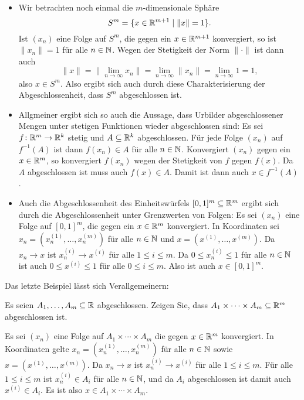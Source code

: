 \documentclass[a4paper,10pt]{article}
\begin{document}
\begin{bsp}
 \begin{itemize}
  \item
   Wir betrachten noch einmal die $m$-dimensionale Sphäre
   \[
    S^m = \{x \in \mathbb{R}^{m+1} \mid \|x\| = 1\}.
   \]
   Ist $(x_n)$ eine Folge auf $S^m$, die gegen ein $x \in \mathbb{R}^{m+1}$ konvergiert, so ist $\|x_n\| = 1$ für alle $n \in \mathbb{N}$. Wegen der Stetigkeit der Norm $\|\cdot\|$ ist dann auch
   \[
    \|x\|
    = \|\lim_{n \to \infty} x_n\|
    = \lim_{n \to \infty} \|x_n\|
    = \lim_{n \to \infty} 1
    = 1,
   \]
   also $x \in S^m$. Also ergibt sich auch durch diese Charakterisierung der Abgeschlossenheit, dass $S^m$ abgeschlossen ist.
  \item
   Allgmeiner ergibt sich so auch die Aussage, dass Urbilder abgeschlossener Mengen unter stetigen Funktionen wieder abgeschlossen sind: Es sei $f \colon \mathbb{R}^m \to \mathbb{R}^k$ stetig und $A \subseteq \mathbb{R}^k$ abgeschlossen. Für jede Folge $(x_n)$ auf $f^{-1}(A)$ ist dann $f(x_n) \in A$ für alle $n \in \mathbb{N}$. Konvergiert $(x_n)$ gegen ein $x \in \mathbb{R}^m$, so konvergiert $f(x_n)$ wegen der Stetigkeit von $f$ gegen $f(x)$. Da $A$ abgeschlossen ist muss auch $f(x) \in A$. Damit ist dann auch $x \in f^{-1}(A)$.
  \item
   Auch die Abgeschlossenheit des Einheitswürfels $[0,1]^m \subseteq \mathbb{R}^m$ ergibt sich durch die Abgeschlossenheit unter Grenzwerten von Folgen: Es sei $(x_n)$ eine Folge auf $[0,1]^m$, die gegen ein $x \in \mathbb{R}^m$ konvergiert. In Koordinaten sei $x_n = (x^{(1)}_n, \dotsc, x^{(m)}_n)$ für alle $n \in \mathbb{N}$ und $x = (x^{(1)}, \dotsc, x^{(m)})$. Da $x_n \to x$ ist $x^{(i)}_n \to x^{(i)}$ für alle $1 \leq i \leq m$. Da $0 \leq x^{(i)}_n \leq 1$ für alle $n \in \mathbb{N}$ ist auch $0 \leq x^{(i)} \leq 1$ für alle $0 \leq i \leq m$. Also ist auch $x \in [0,1]^m$.
 \end{itemize}
\end{bsp}


Das letzte Beispiel lässt sich Verallgemeinern:


\begin{question}
 Es seien $A_1, \dotsc, A_m \subseteq \mathbb{R}$ abgeschlossen. Zeigen Sie, dass $A_1 \times \dotsb \times A_m \subseteq \mathbb{R}^m$ abgeschlossen ist.
\end{question}
\begin{solution}
 Es sei $(x_n)$ eine Folge auf $A_1 \times \dotsb \times A_m$ die gegen $x \in \mathbb{R}^m$ konvergiert. In Koordinaten gelte $x_n = (x^{(1)}_n, \dotsc, x^{(m)}_n)$ für alle $n \in \mathbb{N}$ sowie $x = (x^{(1)}, \dotsc, x^{(m)})$. Da $x_n \to x$ ist $x^{(i)}_n \to x^{(i)}$ für alle $1 \leq i \leq m$. Für alle $1 \leq i \leq m$ ist $x^{(i)}_n \in A_i$ für alle $n \in \mathbb{N}$, und da $A_i$ abgeschlossen ist damit auch $x^{(i)} \in A_i$. Es ist also $x \in A_1 \times \dotsb \times A_m$.
\end{solution}
\end{document}
